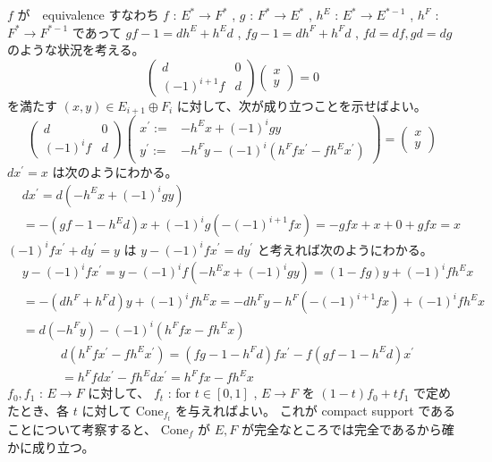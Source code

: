 \documentclass[dvipdfmx]{jsarticle}
\begin{document}
\begin{Proof}
\itemprof
  \(f\) が　equivalence すなわち \(f\) : \(E^{*} \to F^{*}\) , \(g\) : \(F^{*} \to E^{*}\) , \(h^E\) : \(E^{*} \to E^{*-1}\) , \(h^F\) : \(F^{*} \to F^{*-1}\) であって \(g f - 1 = d h^E + h^E d\) , \(f g - 1 = d h^F + h^F d\) , \(f d = d f , g d = d g\) のような状況を考える。
  \[
    \begin{pmatrix}
      d & 0 \\
      (-1)^{i+1} f & d
    \end{pmatrix} \begin{pmatrix}
      x \\ y
    \end{pmatrix} = 0
  \]
  を満たす \((x,y) \in E_{i+1} \oplus F_{i}\) に対して、次が成り立つことを示せばよい。
  \[
    \begin{pmatrix}
      d & 0 \\
      (-1)^{i} f & d
    \end{pmatrix} \begin{pmatrix}
      x^\prime := & - h^E x + (-1)^{i} g y \\ 
      y^\prime := & - h^F y - (-1)^{i} \left(h^F f x^\prime - f h^E x^\prime \right)
    \end{pmatrix} = \begin{pmatrix}
      x \\ y
    \end{pmatrix}
  \]
  \(d x^\prime = x\) は次のようにわかる。
  \begin{align*}
    & d x^\prime
    = d (- h^E x + (-1)^{i} g y) \\
    &= - (g f - 1 - h^E d) x + (-1)^{i} g (- (-1)^{i+1} f x) 
    = - g f x + x + 0 + g f x = x
  \end{align*}
  \((-1)^{i} f x^\prime + d y^\prime = y\) は \(y - (-1)^{i} f x^\prime = d y^\prime\) と考えれば次のようにわかる。
  \begin{align*}
    & y - (-1)^{i} f x^\prime = y - (-1)^{i} f (- h^E x + (-1)^{i} g y) = (1 - f g) y + (-1)^{i} f h^E x \\
    &= -(d h^F + h^F d) y + (-1)^{i} f h^E x
    = - d h^F y - h^F (-(-1)^{i+1} f x) + (-1)^{i} f h^E x \\
    &= d(- h^F y) - (-1)^{i} (h^F f x - f h^E x)
  \end{align*}
  \begin{align*}
    & d (h^F f x^\prime - f h^E x^\prime)
    = (f g - 1 - h^F d) f x^\prime - f (g f - 1 - h^E d) x^\prime \\
    &= h^F f d x^\prime - f h^E d x^\prime = h^F f x - f h^E x
  \end{align*}
\itemprof
  \(f_0 , f_1\) : \(E \to F\) に対して、 \(f_t\) : for \(t \in [0,1]\) , \(E \to F\) を \((1-t) f_0 + t f_1\) で定めたとき、各 \(t\) に対して \(\text{Cone}_{f_t}\) を与えればよい。
  これが compact support であることについて考察すると、 \(\text{Cone}_f\) が \(E,F\) が完全なところでは完全であるから確かに成り立つ。
\end{Proof}
\end{document}

